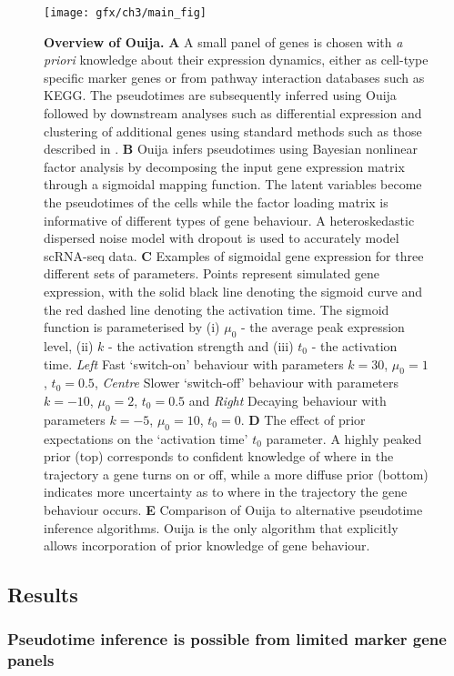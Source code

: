 \begin{figure}[!t]
	\centering
	\texttt{[image: gfx/ch3/main\_fig]}
	\caption{{\bf Overview of Ouija.}
	\textbf{A} A small panel of genes is chosen with \emph{a priori} knowledge about their expression dynamics, either as cell-type specific marker genes or from pathway interaction databases such as KEGG. The pseudotimes are subsequently inferred using Ouija followed by downstream analyses such as differential expression and clustering of additional genes  using standard methods such as those described in \cite{Trapnell2014}.
	\textbf{B} Ouija infers pseudotimes using Bayesian nonlinear factor analysis by decomposing the input gene expression matrix through a sigmoidal mapping function. The latent variables become the pseudotimes of the cells while the factor loading matrix is informative of different types of gene behaviour. A heteroskedastic dispersed noise model with dropout is used to accurately model scRNA-seq data.
	\textbf{C}  Examples of sigmoidal gene expression for three different sets of parameters. Points represent simulated gene expression, with the solid black line denoting the sigmoid curve and the red dashed line denoting the activation time.
	The sigmoid function is parameterised by (i) $\mu_0$ - the average peak expression level, (ii) $k$ - the activation strength and (iii) $t_0$ - the activation time. \emph{Left} Fast `switch-on' behaviour with parameters $k= 30$, $\mu_0 = 1$, $t_0 = 0.5$, \emph{Centre} Slower `switch-off' behaviour with parameters $k= -10$, $\mu_0 = 2$, $t_0 = 0.5$ and \emph{Right} Decaying behaviour with parameters $k= -5$, $\mu_0 = 10$, $t_0 = 0$.
	\textbf{D} The effect of prior expectations on the `activation time' $t_0$ parameter. A highly peaked prior (top) corresponds to confident knowledge of where in the trajectory a gene turns on or off, while a more diffuse prior (bottom) indicates more uncertainty as to where in the trajectory the gene behaviour occurs.
	\textbf{E} Comparison of Ouija to alternative pseudotime inference algorithms. Ouija is the only algorithm that explicitly allows incorporation of prior knowledge of gene behaviour.}
	\label{fig:main}
\end{figure}



\subsection{Results}

\subsubsection{Pseudotime inference is possible from limited marker gene panels}

